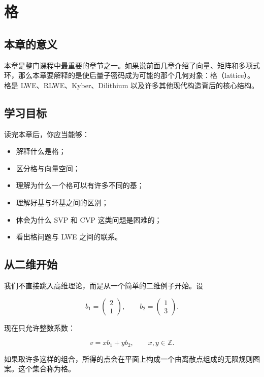 \chapter{格}
\label{ch:lattice}

\section{本章的意义}
本章是整门课程中最重要的章节之一。如果说前面几章介绍了向量、矩阵和多项式环，那么本章要解释的是使后量子密码成为可能的那个几何对象：格（lattice）。格是 LWE、RLWE、Kyber、Dilithium 以及许多其他现代构造背后的核心结构。

\section{学习目标}
读完本章后，你应当能够：

\begin{itemize}
  \item 解释什么是格；
  \item 区分格与向量空间；
  \item 理解为什么一个格可以有许多不同的基；
  \item 理解好基与坏基之间的区别；
  \item 体会为什么 SVP 和 CVP 这类问题是困难的；
  \item 看出格问题与 LWE 之间的联系。
\end{itemize}

\section{从二维开始}
我们不直接跳入高维理论，而是从一个简单的二维例子开始。设

\[
b_1 = \begin{pmatrix}2\\1\end{pmatrix}, \qquad b_2 = \begin{pmatrix}1\\3\end{pmatrix}.
\]

现在只允许整数系数：

\[
v = x b_1 + y b_2, \qquad x,y \in \mathbb{Z}.
\]

如果取许多这样的组合，所得的点会在平面上构成一个由离散点组成的无限规则图案。这个集合称为格。

